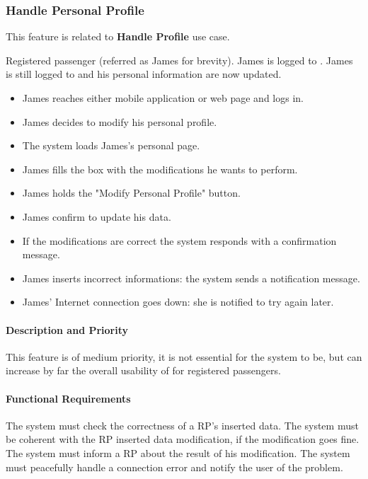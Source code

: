 \subsubsection{Handle Personal Profile}
This feature is related to \textbf{Handle Profile} use case.
\begin{itemize}
	 Registered passenger (referred as James for brevity).
	 James is logged to \myTaxiService{}.
	 James is still logged to \myTaxiService{} and his personal information are now updated.
	\begin{itemize}
		\item James reaches either \myTaxiService{} mobile application or web page and logs in.
		\item James decides to modify his personal profile.
		\item The system loads James's personal page.
		\item James fills the box with the modifications he wants to perform.
		\item James holds the "Modify Personal Profile" button.
		\item James confirm to update his data.
		\item If the modifications are correct the system responds with a confirmation message.
	\end{itemize}
	\begin{itemize}
		\item James inserts incorrect informations: the system sends a notification message.
		\item James' Internet connection goes down: she is notified to try again later.
	\end{itemize}
\end{itemize}
\paragraph{Description and Priority}
This feature is of medium priority, it is not essential for the system to be, but can increase by far the overall usability of \myTaxiService{} for registered passengers.
\paragraph{Functional Requirements}
\begin{itemize}
	 The system must check the correctness of a RP's inserted data.
	 The system must be coherent with the RP inserted data modification, if the modification goes fine.
	 The system must inform a RP about the result of his modification.
	 The system must peacefully handle a connection error and notify the user of the problem.
\end{itemize}

